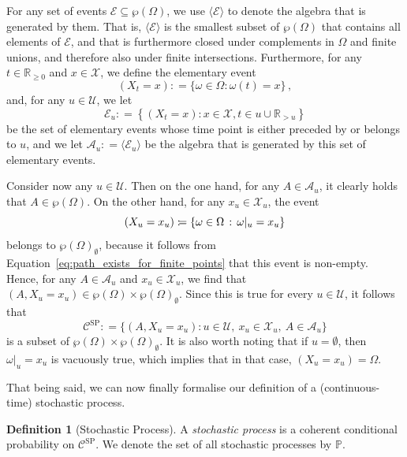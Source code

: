 \documentclass[10pt,a4paper]{paper}
\theoremstyle{definition}
\newtheorem{definition}{Definition}
\newcommand{\reals}{\mathbb{R}}
\newcommand{\realsnonneg}{\reals_{\geq 0}}
\newcommand{\states}{\mathcal{X}}
\newcommand{\paths}{\Omega}
\newcommand{\power}{\wp(\paths)}
\newcommand{\nonemptypower}{\power_{\emptyset}}
\newcommand{\processes}{\mathbb{P}}
\newcommand{\coloneqq}{:\!=}
\begin{document}
For any set of events $\mathcal{E}\subseteq\power$, we use $\langle\mathcal{E}\rangle$ to denote the algebra that is generated by them. That is, $\langle\mathcal{E}\rangle$ is the smallest subset of $\power$ that contains all elements of $\mathcal{E}$, and that is furthermore closed under complements in $\Omega$ and finite unions, and therefore also under finite intersections. 
Furthermore, for any $t\in\realsnonneg$ and $x\in\states$, we define the elementary event
\begin{equation*}
(X_t=x)\coloneqq\{\omega\in\paths\colon\omega(t)=x\}\,,
\end{equation*}
and, for any $u\in\mathcal{U}$, we let
\begin{equation*}
\mathcal{E}_u \coloneqq \left\{
(X_t=x)
\colon
x\in\states,t\in u\cup\reals_{>u}
\right\}
\end{equation*}
be the set of elementary events whose time point is either preceded by or belongs to $u$, and we let $\mathcal{A}_u\coloneqq\langle\mathcal{E}_u\rangle$ be the algebra that is generated by this set of elementary events. 

Consider now any $u\in\mathcal{U}$. Then on the one hand, for any $A\in\mathcal{A}_u$, it clearly holds that $A\in\power$. On the other hand, for any $x_u\in\states_u$, the event
\begin{equation*}
(X_u=x_u) \coloneqq \{\omega\in\Omega\,:\,\omega\vert_u=x_u\}
\vspace{4pt}
\end{equation*}
belongs to $\nonemptypower$, because it follows from Equation~\eqref{eq:path_exists_for_finite_points} that this event is non-empty. 
Hence, for any $A\in\mathcal{A}_u$ and $x_u\in\states_u$, we find that $(A,X_u=x_u)\in\power\times\nonemptypower$. Since this is true for every $u\in\mathcal{U}$, it follows that
\begin{equation*}
\mathcal{C}^\mathrm{SP}\coloneqq\big\{
(A,X_u=x_u)
\colon
u\in\mathcal{U},~x_u\in\states_u,~A\in\mathcal{A}_u\big\}
\end{equation*}
is a subset of $\power\times\nonemptypower$. It is also worth noting that if $u=\emptyset$, then $\omega\vert_u=x_u$ is vacuously true, which implies that in that case, $(X_u=x_u)=\Omega$.

That being said, we can now finally formalise our definition of a (continuous-time) stochastic process.

\begin{definition}[Stochastic Process]\label{def:stoch_process}
A \emph{stochastic process} is a coherent conditional probability on $\mathcal{C}^\mathrm{SP}$. We denote the set of all stochastic processes by $\processes$.
\end{definition}
\end{document}
